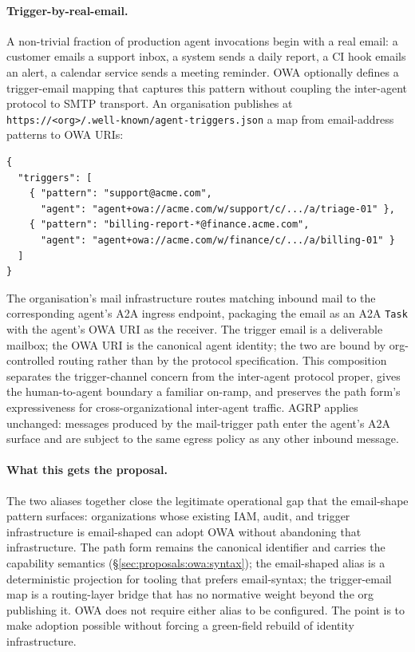 \paragraph{Trigger-by-real-email.}
A non-trivial fraction of production agent invocations
begin with a real email: a customer emails a support
inbox, a system sends a daily report, a CI hook emails an
alert, a calendar service sends a meeting reminder. OWA
optionally defines a trigger-email mapping that captures
this pattern without coupling the inter-agent protocol to
SMTP transport. An organisation publishes at
\texttt{https://<org>/.well-known/agent-triggers.json}
a map from email-address patterns to OWA URIs:

\begin{verbatim}
{
  "triggers": [
    { "pattern": "support@acme.com",
      "agent": "agent+owa://acme.com/w/support/c/.../a/triage-01" },
    { "pattern": "billing-report-*@finance.acme.com",
      "agent": "agent+owa://acme.com/w/finance/c/.../a/billing-01" }
  ]
}
\end{verbatim}

The organisation's mail infrastructure routes matching
inbound mail to the corresponding agent's A2A ingress
endpoint, packaging the email as an A2A
\texttt{Task} with the agent's OWA URI as the receiver.
The trigger email is a deliverable mailbox; the OWA URI
is the canonical agent identity; the two are bound by
org-controlled routing rather than by the protocol
specification. This composition separates the
trigger-channel concern from the inter-agent protocol
proper, gives the human-to-agent boundary a familiar
on-ramp, and preserves the path form's expressiveness
for cross-organizational inter-agent traffic. AGRP
applies unchanged: messages produced by the
mail-trigger path enter the agent's A2A surface and are
subject to the same egress policy as any other inbound
message.

\paragraph{What this gets the proposal.}
The two aliases together close the legitimate operational
gap that the email-shape pattern surfaces: organizations
whose existing IAM, audit, and trigger infrastructure is
email-shaped can adopt OWA without abandoning that
infrastructure. The path form remains the canonical
identifier and carries the capability semantics
(\S\ref{sec:proposals:owa:syntax}); the email-shaped
alias is a deterministic projection for tooling that
prefers email-syntax; the trigger-email map is a
routing-layer bridge that has no normative weight beyond
the org publishing it. OWA does not require either
alias to be configured. The point is to make adoption
possible without forcing a green-field rebuild of
identity infrastructure.

